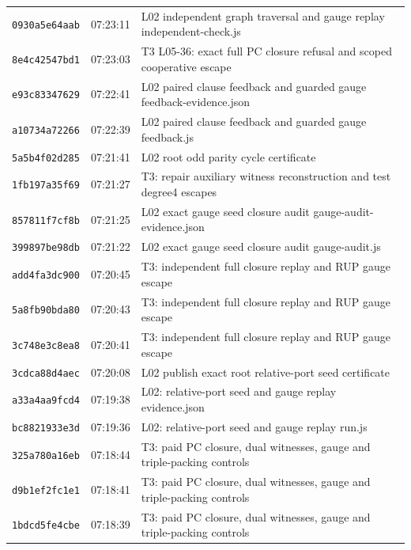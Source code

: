\documentclass[11pt]{article}
\theoremstyle{remark}
\begin{document}
\begin{longtable}{lll}
\texttt{0930a5e64aab} & 07:23:11 & {\footnotesize L02 independent graph traversal and gauge replay independent-check.js}\\
\texttt{8e4c42547bd1} & 07:23:03 & {\footnotesize T3 L05-36: exact full PC closure refusal and scoped cooperative escape}\\
\texttt{e93c83347629} & 07:22:41 & {\footnotesize L02 paired clause feedback and guarded gauge feedback-evidence.json}\\
\texttt{a10734a72266} & 07:22:39 & {\footnotesize L02 paired clause feedback and guarded gauge feedback.js}\\
\texttt{5a5b4f02d285} & 07:21:41 & {\footnotesize L02 root odd parity cycle certificate}\\
\texttt{1fb197a35f69} & 07:21:27 & {\footnotesize T3: repair auxiliary witness reconstruction and test degree4 escapes}\\
\texttt{857811f7cf8b} & 07:21:25 & {\footnotesize L02 exact gauge seed closure audit gauge-audit-evidence.json}\\
\texttt{399897be98db} & 07:21:22 & {\footnotesize L02 exact gauge seed closure audit gauge-audit.js}\\
\texttt{add4fa3dc900} & 07:20:45 & {\footnotesize T3: independent full closure replay and RUP gauge escape}\\
\texttt{5a8fb90bda80} & 07:20:43 & {\footnotesize T3: independent full closure replay and RUP gauge escape}\\
\texttt{3c748e3c8ea8} & 07:20:41 & {\footnotesize T3: independent full closure replay and RUP gauge escape}\\
\texttt{3cdca88d4aec} & 07:20:08 & {\footnotesize L02 publish exact root relative-port seed certificate}\\
\texttt{a33a4aa9fcd4} & 07:19:38 & {\footnotesize L02: relative-port seed and gauge replay evidence.json}\\
\texttt{bc8821933e3d} & 07:19:36 & {\footnotesize L02: relative-port seed and gauge replay run.js}\\
\texttt{325a780a16eb} & 07:18:44 & {\footnotesize T3: paid PC closure, dual witnesses, gauge and triple-packing controls}\\
\texttt{d9b1ef2fc1e1} & 07:18:41 & {\footnotesize T3: paid PC closure, dual witnesses, gauge and triple-packing controls}\\
\texttt{1bdcd5fe4cbe} & 07:18:39 & {\footnotesize T3: paid PC closure, dual witnesses, gauge and triple-packing controls}\\

\end{longtable}
\end{document}
